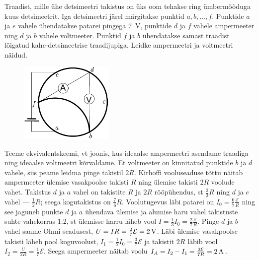 
Traadist, mille ühe detsimeetri takistus on üks oom tehakse ring ümbermõõduga kuus detsimeetrit. Iga detsimeetri järel märgitakse punktid $a, b, \ldots, f$. Punktide $a$ ja $e$ vahele ühendatakse patarei pingega \SI{7}{V}, punktide $d$ ja $f$ vahele ampermeeter ning $d$ ja $b$ vahele voltmeeter. Punktid $f$ ja $b$ ühendatakse samast traadist lõigatud kahe-detsimeetrise traadijupiga. Leidke ampermeetri ja voltmeetri näidud.




\hint

\solu
\begin{figure}
	\vspace{-20pt}
	\begin{center}
		\includegraphics[width = 0.4\textwidth]{2018-lahg-03-yl.pdf}
	\end{center}
\end{figure}

Teeme ekvivalentskeemi, vt joonis, kus ideaalse ampermeetri asendame traadiga ning ideaalse voltmeetri kõrvaldame. Et voltmeeter on kinnitatud punktide $b$ ja $d$ vahele, siis peame leidma pinge takistil $2R$. Kirhoffi vooluseaduse tõttu näitab ampermeeter ülemise vasakpoolse takisti $R$ ning ülemise takisti $2R$ voolude vahet. Takistus $d$ ja $a$ vahel on takistite $R$ ja $2R$ rööpühendus, st $\frac 23R$ ning $d$ ja $e$ vahel --- $\frac 12R$; seega kogutakistus on $\frac 76R$. Voolutugevus läbi patarei on $I_0=\frac 67\frac{\mathcal E}R$ ning see jaguneb punkte $d$ ja $a$ ühendava ülemise ja alumise haru vahel takistuste suhte vahekorras 1:2, st ülemisse harru läheb vool $I=\frac 13I_0=\frac 27\frac{\mathcal E}R$. Pinge $d$ ja $b$ vahel saame Ohmi seadusest, $U=IR=\frac 27\mathcal E=\SI 2V$. Läbi ülemise vasakpoolse takisti läheb pool koguvoolust, $I_1=\frac 12 I_0=\frac 37\mathcal E$ ja takistit $2R$ läbib vool $I_2=\frac U{2R}= \frac 17\mathcal E$. Seega ampermeeter näitab voolu $I_A=I_2-I_1=\frac{2\mathcal E}{7R}=\SI 2A$.\probend